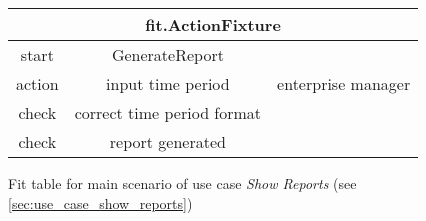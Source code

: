 \begin{figure}[H]
\begin{centering}
\begin{tabular}{|c|c|c|}
\hline \multicolumn{3}{|c|}{fit.ActionFixture} \\
\hline start & GenerateReport &  \\ 
\hline action & input time period & enterprise manager \\ 
\hline check & correct time period format &  \\ 
\hline check & report generated &  \\ 
\hline 
\end{tabular}
\caption{Fit table for main scenario of use case \emph{Show Reports} (see \autoref{sec:use_case_show_reports})}
\end{centering}
\end{figure}

